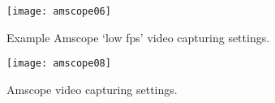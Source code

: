 \begin{figure}[hb!]
	\centering
	\texttt{[image: amscope06]}
	\caption{Example Amscope `low fps' video capturing settings.}
	\label{fig:low-fps}
\end{figure}

\begin{figure}[ht]
	\centering
	\texttt{[image: amscope08]}
	\caption{Amscope video capturing settings.}
	\label{fig:am-cap}
\end{figure}

%
%
